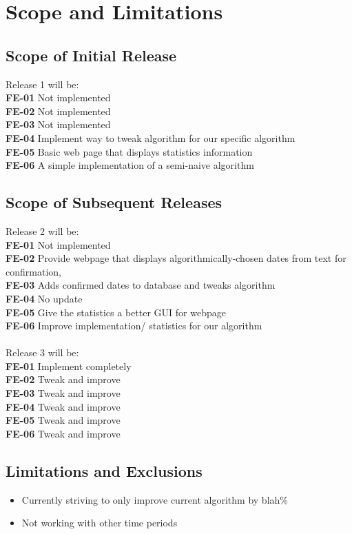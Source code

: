\documentclass[11pt]{article}
\begin{document}
\section{Scope and Limitations}
\subsection{Scope of Initial Release}
Release 1 will be: \\
\textbf{FE-01} Not implemented \\
\textbf{FE-02} Not implemented \\
\textbf{FE-03} Not implemented \\
\textbf{FE-04} Implement way to tweak algorithm for our specific algorithm \\
\textbf{FE-05} Basic web page that displays statistics information \\
\textbf{FE-06} A simple implementation of a semi-naive algorithm

\subsection{Scope of Subsequent Releases}
Release 2 will be: \\
\textbf{FE-01} Not implemented \\
\textbf{FE-02} Provide webpage that displays algorithmically-chosen dates from text for confirmation, \\
\textbf{FE-03} Adds confirmed dates to database and tweaks algorithm \\
\textbf{FE-04} No update \\
\textbf{FE-05} Give the statistics a better GUI for webpage \\
\textbf{FE-06} Improve implementation/ statistics for our algorithm \\
 \\
Release 3 will be: \\
\textbf{FE-01} Implement completely \\
\textbf{FE-02} Tweak and improve \\
\textbf{FE-03} Tweak and improve \\
\textbf{FE-04} Tweak and improve \\
\textbf{FE-05} Tweak and improve \\
\textbf{FE-06} Tweak and improve

\subsection{Limitations and Exclusions}
\begin{itemize}
    \item Currently striving to only improve current algorithm by blah\%
    \item Not working with other time periods
\end{itemize}
\end{document}
